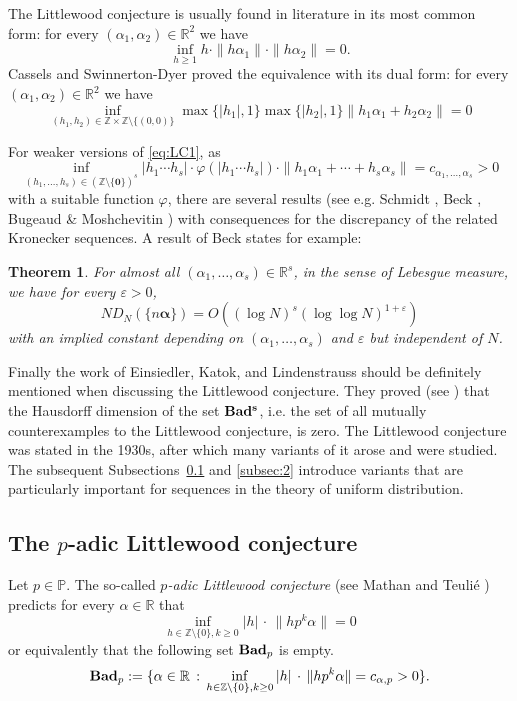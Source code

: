 \documentclass{article}
\newcommand{\bsalpha}{\boldsymbol{\alpha}}%
\newcommand{\ZZ}{\mathbb Z}
\newcommand{\RR}{\mathbb R}
\newcommand{\PP}{\mathbb P}
\renewcommand{\(}{\left (}
\renewcommand{\)}{\right )}
\newtheorem{theorem}{Theorem}[section]
\theoremstyle{definition}
\numberwithin{equation}{section}
\begin{document}
The Littlewood conjecture is usually found in literature in its most common form: for every $(\alpha_1,\alpha_2)\in\RR^2$ we have $$\inf_{h\geq 1} h\cdot\|h\alpha_1\|\cdot\|h\alpha_2\|=0.$$
Cassels and Swinnerton-Dyer \cite{Cas-S1955} proved the equivalence with its dual form: for every $(\alpha_1,\alpha_2)\in\RR^2$ we have $$\inf_{(h_1,h_2)\in\ZZ\times \ZZ\setminus\{(0,0)\}} \max\{|h_1|,1\}\max\{|h_2|,1\}\|h_1 \alpha_1+h_2\alpha_2\|=0$$


For weaker versions of \eqref{eq:LC1}, as
$$\inf_{(h_1,\ldots,h_s)\in(\ZZ\setminus\{\boldsymbol{0}\})^s} |h_1\cdots h_s|\cdot \varphi(|h_1\cdots h_s|) \cdot\|h_1\alpha_1+\cdots+h_s\alpha_s\|=c_{\alpha_1,\ldots,\alpha_s}>0$$
with a suitable function $\varphi$,
there are several results (see e.g. Schmidt \cite{schmidt1964}, Beck \cite{beck1994}, Bugeaud \& Moshchevitin \cite{BM2011}) with consequences for the discrepancy of the related Kronecker sequences. A result of Beck \cite[Theorem~1]{beck1994} states for example: 

\begin{theorem}\label{thm:beck}
	For almost all $(\alpha_1,\ldots,\alpha_s)\in\RR^s$, in the sense of Lebesgue measure, we have for every $\varepsilon>0$, 
	$$ND_N(\{n\bsalpha\})=O((\log N)^s (\log\log  N)^{1+\varepsilon})  $$
	with an implied constant depending on $(\alpha_1,\ldots,\alpha_s)$ and $\varepsilon$ but independent of $N$.
\end{theorem} 



Finally the work of Einsiedler, Katok, and Lindenstrauss \cite{EKL06} should be definitely mentioned when discussing the Littlewood conjecture. They proved (see \cite[Theorem~1.5]{EKL06}) that the Hausdorff dimension of the set ${\bf{Bad^s}}$, i.e. the set of all mutually counterexamples to the Littlewood conjecture, is zero. The Littlewood conjecture was stated in the 1930s, after which many variants of it arose and were studied. The subsequent Subsections~\ref{subsec:1} and \ref{subsec:2} introduce variants that are particularly important for sequences in the theory of uniform distribution.


\subsection{The $p$-adic Littlewood conjecture}\label{subsec:1}

Let $p\in\PP$. The so-called \emph{$p$-adic Littlewood conjecture} (see Mathan and Teuli\'{e} \cite{MatTeu2004}) predicts for every $\alpha\in\RR$ that $$\inf_{h\in\ZZ\setminus\{0\},k\geq 0} |h|\,\cdot\,\|hp^k \alpha\|=0$$ or equivalently that the following set ${\bf{Bad}}_p$ is empty. 
$${\bf{Bad}}_p:=\{\alpha \in\RR\,:\, \inf_{h\in\ZZ\setminus\{0\},k\geq 0} |h|\,\cdot\,\|hp^k \alpha\|=c_{\alpha,p}>0\}.$$
\end{document}
